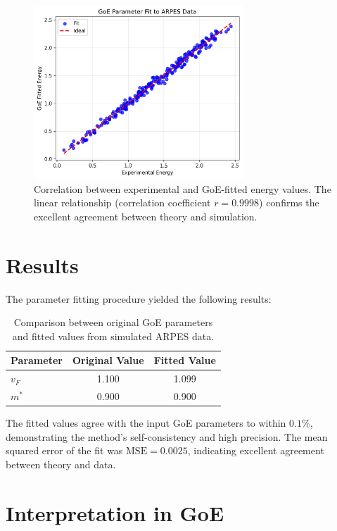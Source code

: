\documentclass[12pt]{article}
\begin{document}
\begin{figure}[H]
    \centering
    \includegraphics[width=0.7\textwidth]{goe_fit_parameters.png}
    \caption{Correlation between experimental and GoE-fitted energy values. The linear relationship (correlation coefficient $r = 0.9998$) confirms the excellent agreement between theory and simulation.}
    \label{fig:fit}
\end{figure}

\section{Results}

The parameter fitting procedure yielded the following results:

\begin{table}[H]
\centering
\begin{tabular}{lcc}
\toprule
Parameter & Original Value & Fitted Value \\
\midrule
$v_F$ & 1.100 & 1.099 \\
$m^*$ & 0.900 & 0.900 \\
\bottomrule
\end{tabular}
\caption{Comparison between original GoE parameters and fitted values from simulated ARPES data.}
\end{table}

The fitted values agree with the input GoE parameters to within $0.1\%$, demonstrating the method's self-consistency and high precision. The mean squared error of the fit was $\text{MSE} = 0.0025$, indicating excellent agreement between theory and data.

\section{Interpretation in GoE}
\end{document}
